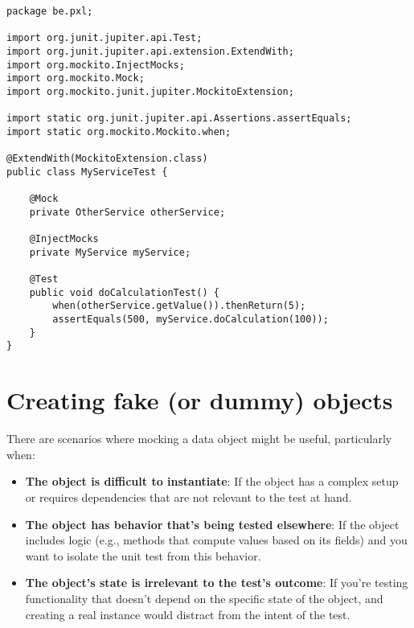 \begin{lstlisting}
package be.pxl;

import org.junit.jupiter.api.Test;
import org.junit.jupiter.api.extension.ExtendWith;
import org.mockito.InjectMocks;
import org.mockito.Mock;
import org.mockito.junit.jupiter.MockitoExtension;

import static org.junit.jupiter.api.Assertions.assertEquals;
import static org.mockito.Mockito.when;

@ExtendWith(MockitoExtension.class)
public class MyServiceTest {

    @Mock
    private OtherService otherService;
    
    @InjectMocks
    private MyService myService;

    @Test
    public void doCalculationTest() {
        when(otherService.getValue()).thenReturn(5);
        assertEquals(500, myService.doCalculation(100));
    }
}
\end{lstlisting}

\section{Creating fake (or dummy) objects}

There are scenarios where mocking a data object might be useful, particularly when:

\begin{itemize}
\item \textbf{The object is difficult to instantiate}: If the object has a complex setup or requires dependencies that are not relevant to the test at hand.
\item \textbf{The object has behavior that's being tested elsewhere}: If the object includes logic (e.g., methods that compute values based on its fields) and you want to isolate the unit test from this behavior.
\item \textbf{The object's state is irrelevant to the test's outcome}: If you're testing functionality that doesn't depend on the specific state of the object, and creating a real instance would distract from the intent of the test.
\end{itemize}

